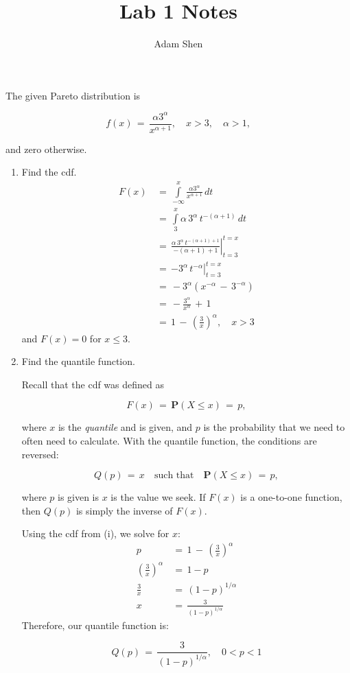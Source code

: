\documentclass[11pt,letterpaper]{article}
\title{Lab 1 Notes}
\author{Adam Shen}
\date{}
\newcommand{\Prob}[1]{\mathbf{P}\left(#1\right)}
\newcommand{\blue}[1]{{\color{blue}#1}}
\begin{document}
\maketitle

The given Pareto distribution is

\[f(x) \,=\, \frac{\alpha 3^{\alpha}}{x^{\alpha+1}}, \quad x > 3, \quad \alpha > 1,\]

and zero otherwise.

\begin{enumerate}[label=(\roman*)]
\item Find the cdf.
\blue{
\begin{align*}
F(x) \,&=\, \int\limits_{-\infty}^{x}\frac{\alpha 3^{\alpha}}{x^{\alpha+1}}\,dt\\[3mm]
\,&=\, \int\limits_{3}^{x}\alpha\,3^{\alpha}\,t^{-(\alpha + 1)}\,dt\\[3mm]
\,&=\, \left. \frac{\alpha\,3^{\alpha}\,t^{-(\alpha + 1) + 1}}{-(\alpha + 1) + 1} \right|_{t=3}^{t=x}\\[3mm]
\,&=\, \left. -3^{\alpha}\,t^{-\alpha}\right|_{t=3}^{t=x}\\[3mm]
\,&=\, -3^{\alpha}(x^{-\alpha} \,-\, 3^{-\alpha})\\[3mm]
\,&=\, -\frac{3^{\alpha}}{x^{\alpha}} \,+\, 1\\[3mm]
\,&=\, 1 \,-\, \left(\frac{3}{x}\right)^{\alpha}, \quad x > 3
\end{align*}
and $F(x) = 0$ for $x \leq 3$.
}

\item Find the quantile function.

Recall that the cdf was defined as

\[F(x) \,=\, \Prob{X \leq x} \,=\, p,\]

where $x$ is the \emph{quantile} and is given, and $p$ is the probability that we need to often
need to calculate. With the quantile function, the conditions are reversed:

\[Q(p) \,=\, x \quad\text{such that}\quad \Prob{X \leq x} \,=\, p,\]

where $p$ is given is $x$ is the value we seek. If $F(x)$ is a one-to-one function, then $Q(p)$ is
simply the inverse of $F(x)$.

\blue{
Using the cdf from (i), we solve for $x$:
\begin{align*}
p \,&=\, 1 \,-\, \left(\frac{3}{x}\right)^{\alpha}\\[3mm]
\left(\frac{3}{x}\right)^{\alpha} \,&=\, 1-p\\[3mm]
\frac{3}{x} \,&=\, (1-p)^{1/\alpha}\\[3mm]
x \,&=\, \frac{3}{(1-p)^{1/\alpha}}
\end{align*}
Therefore, our quantile function is:

\[Q(p) \,=\, \frac{3}{(1-p)^{1/\alpha}}, \quad 0 < p < 1\]
}
\end{enumerate}
\end{document}
